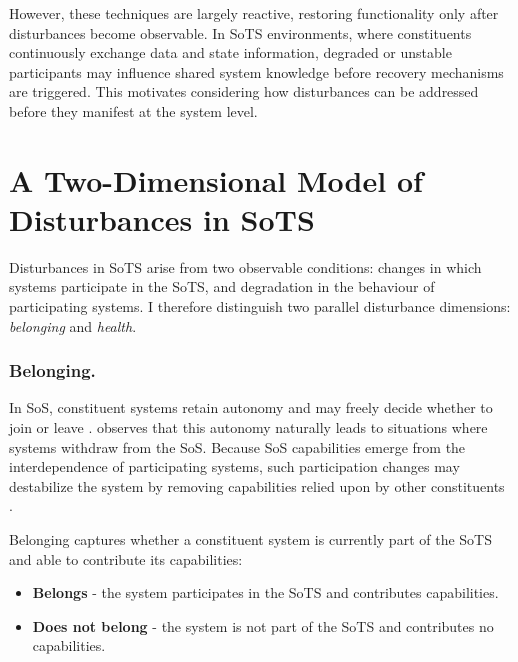However, these techniques are largely reactive, restoring functionality only after disturbances become observable. In SoTS environments, where constituents continuously exchange data and state information, degraded or unstable participants may influence shared system knowledge before recovery mechanisms are triggered. This motivates considering how disturbances can be addressed before they manifest at the system level.

\section{A Two-Dimensional Model of Disturbances in SoTS}
Disturbances in SoTS arise from two observable conditions: changes in which systems participate in the SoTS, and degradation in the behaviour of participating systems. I therefore distinguish two parallel  disturbance dimensions: \emph{belonging} and \emph{health}.



\subsubsection{Belonging.}
In SoS, constituent systems retain autonomy and may freely decide whether to join or leave \cite{boardman2006system, baldwin2011formation}. \citet{salado2015abandonment} observes that this autonomy naturally leads to situations where systems withdraw from the SoS. Because SoS capabilities emerge from the interdependence of participating systems, such participation changes may destabilize the system by removing capabilities relied upon by other constituents \cite{salado2016exile}.

Belonging captures whether a constituent system is currently part of the SoTS and able to contribute its capabilities:
\begin{itemize}
    \item \textbf{Belongs} - the system participates in the SoTS and contributes capabilities.
    \item \textbf{Does not belong} - the system is not part of the SoTS and contributes no capabilities.
\end{itemize}


